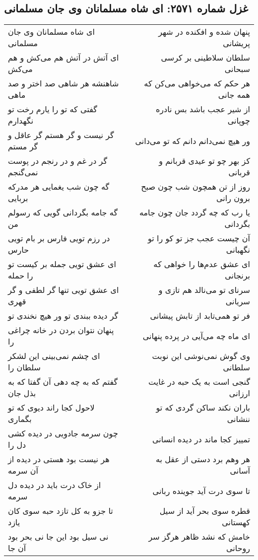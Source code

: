 \begin{center}
\section*{غزل شماره ۲۵۷۱: ای شاه مسلمانان وی جان مسلمانی}
\label{sec:2571}
\begin{longtable}{l p{0.5cm} r}
ای شاه مسلمانان وی جان مسلمانی
&&
پنهان شده و افکنده در شهر پریشانی
\\
ای آتش در آتش هم می‌کش و هم می‌کش
&&
سلطان سلاطینی بر کرسی سبحانی
\\
شاهنشه هر شاهی صد اختر و صد ماهی
&&
هر حکم که می‌خواهی می‌کن که همه جانی
\\
گفتی که تو را یارم رخت تو نگهدارم
&&
از شیر عجب باشد بس نادره چوپانی
\\
گر نیست و گر هستم گر عاقل و گر مستم
&&
ور هیچ نمی‌دانم دانم که تو می‌دانی
\\
گر در غم و در رنجم در پوست نمی‌گنجم
&&
کز بهر چو تو عیدی قربانم و قربانی
\\
گه چون شب یغمایی هر مدرکه بربایی
&&
روز از تن همچون شب چون صبح برون رانی
\\
گه جامه بگردانی گویی که رسولم من
&&
یا رب که چه گردد جان چون جامه بگردانی
\\
در رزم تویی فارس بر بام تویی حارس
&&
آن چیست عجب جز تو کو را تو نگهبانی
\\
ای عشق تویی جمله بر کیست تو را حمله
&&
ای عشق عدم‌ها را خواهی که برنجانی
\\
ای عشق تویی تنها گر لطفی و گر قهری
&&
سرنای تو می‌نالد هم تازی و سریانی
\\
گر دیده ببندی تو ور هیچ نخندی تو
&&
فر تو همی‌تابد از تابش پیشانی
\\
پنهان نتوان بردن در خانه چراغی را
&&
ای ماه چه می‌آیی در پرده پنهانی
\\
ای چشم نمی‌بینی این لشکر سلطان را
&&
وی گوش نمی‌نوشی این نوبت سلطانی
\\
گفتم که به چه دهی آن گفتا که به بذل جان
&&
گنجی است به یک حبه در غایت ارزانی
\\
لاحول کجا راند دیوی که تو بگماری
&&
باران نکند ساکن گردی که تو ننشانی
\\
چون سرمه جادویی در دیده کشی دل را
&&
تمییز کجا ماند در دیده انسانی
\\
هر نیست بود هستی در دیده از آن سرمه
&&
هر وهم برد دستی از عقل به آسانی
\\
از خاک درت باید در دیده دل سرمه
&&
تا سوی درت آید جوینده ربانی
\\
تا جزو به کل تازد حبه سوی کان یازد
&&
قطره سوی بحر آید از سیل کهستانی
\\
نی سیل بود این جا نی بحر بود آن جا
&&
خامش که نشد ظاهر هرگز سر روحانی
\\
\end{longtable}
\end{center}
